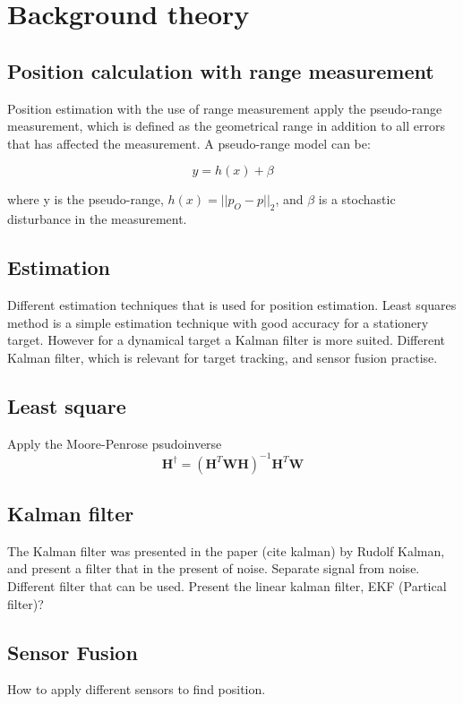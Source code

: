 \chapter{Background theory}
\section{Position calculation with range measurement}

Position estimation with the use of range measurement apply the pseudo-range measurement, which is defined as the geometrical range in addition to all errors that has affected the measurement. A pseudo-range model can be:

\begin{equation}
y = h(x) + \beta
\end{equation}

where y is the pseudo-range, $h(x) = ||p_O - p||_2$, and $\beta$ is a stochastic disturbance in the measurement.

\section{Estimation}
Different estimation techniques that is used for position estimation. Least squares method is a simple estimation technique with good accuracy for a stationery target. However for a dynamical target a Kalman filter is more suited. Different Kalman filter, which is relevant for target tracking, and sensor fusion practise.

\section{Least square}
Apply the Moore-Penrose psudoinverse
\begin{equation}
\textbf{H}^{\dagger} = (\textbf{H}^T\textbf{W}\textbf{H})^{-1}\textbf{H}^T\textbf{W}
\end{equation}

\section{Kalman filter}
The Kalman filter was presented in the paper (cite kalman) by Rudolf Kalman, and present a filter that in the present of noise. Separate signal from noise.
Different filter that can be used. Present the linear kalman filter, EKF (Partical filter)?

\section{Sensor Fusion}
How to apply different sensors to find position.
